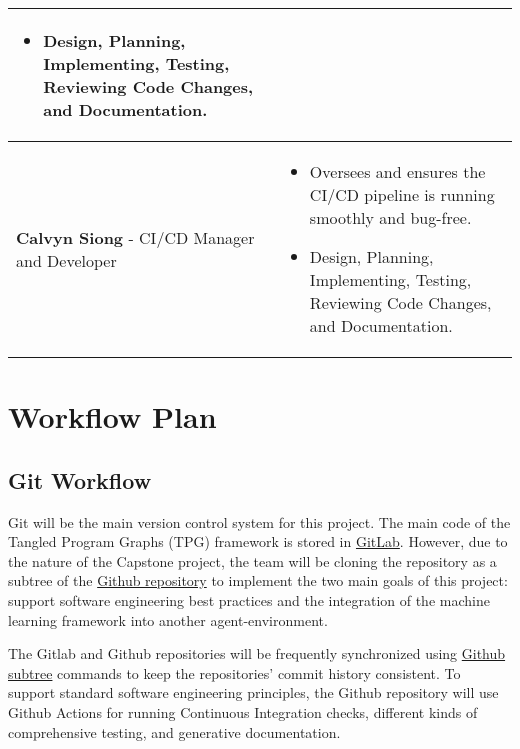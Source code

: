 \documentclass{article}
\begin{document}
\begin{center}
\begin{tabular}{ | m{4cm} | m{9cm} | }
\begin{itemize}
      \item Design, Planning, Implementing, Testing, Reviewing Code Changes, and Documentation.
    \end{itemize}\\ 
      \hline
        \textbf{Calvyn Siong} - CI/CD Manager and Developer & \begin{itemize}
      \item Oversees and ensures the CI/CD pipeline is running smoothly and bug-free.
      \item Design, Planning, Implementing, Testing, Reviewing Code Changes, and Documentation.
    \end{itemize}\\ 
      \hline

  \end{tabular}
\end{center}

\section{Workflow Plan}

\subsection{Git Workflow}
Git will be the main version control system for this project. The main code of the Tangled Program Graphs (TPG) framework is stored in \href{https://gitlab.cas.mcmaster.ca/kellys32/tpg}{GitLab}. However, due to the nature of the Capstone project, the team will be cloning the repository as a subtree of the \href{https://github.com/TPGEngine/tpg}{Github repository} to implement the two main goals of this project: support software engineering best practices and the integration of the machine learning framework into another agent-environment. 

\vspace*{10pt}

\noindent The Gitlab and Github repositories will be frequently synchronized using \href{https://gist.github.com/SKempin/b7857a6ff6bddb05717cc17a44091202}{Github subtree} commands to keep the repositories’ commit history consistent. To support standard software engineering principles, the Github repository will use Github Actions for running Continuous Integration checks, different kinds of comprehensive testing, and generative documentation.

\vspace{10pt}
\end{document}
